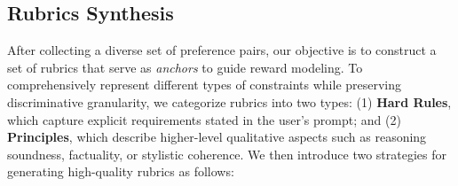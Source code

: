 


\subsection{Rubrics Synthesis}
\label{sec:rubrics_gen}
After collecting a diverse set of preference pairs, our objective is to construct a set of rubrics that serve as \emph{anchors} to guide   reward modeling.
To comprehensively represent different types of constraints while preserving discriminative granularity, we categorize rubrics into two  types:
(1) \textbf{Hard Rules}, which capture explicit requirements stated in the user’s prompt; and
(2) \textbf{Principles}, which describe higher-level qualitative aspects such as reasoning soundness, factuality, or stylistic coherence.
We then introduce two strategies for generating high-quality rubrics as follows:  


